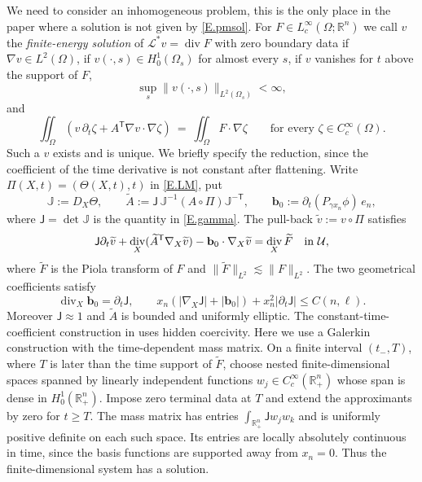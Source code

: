 \documentclass[10pt,a4paper]{amsart}
\numberwithin{equation}{section}
\DeclareMathOperator{\divg}{div}
\newcommand{\R}{\mathbb R}
\newcommand{\br}[1]{\left(#1\right)}
\newcommand{\om}{\Omega}
\newcommand{\pd}{\partial}
\newcommand{\LL}{\mathcal L}
\newcommand{\Uc}{\mathcal U}
\begin{document}
We need to consider an  inhomogeneous problem, this is  the only place in the paper
where a solution is not given by \eqref{E.pmsol}. For
$F\in L^\infty_c(\om;\R^n)$ we call $v$ the \emph{finite-energy solution} of
$\LL^*v=\divg F$ with zero boundary data if $\nabla v\in L^2(\om)$, if
$v(\cdot,s)\in H^1_0(\om_s)$ for almost every $s$, if $v$ vanishes for $t$ above
the support of $F$, 
$$\sup_s\|v(\cdot,s)\|_{L^2(\om_s)}<\infty,$$
and
\begin{equation}\label{E.PDweak}
  \iint_\om\br{v\,\pd_t\zeta+A^{\mathsf T}\nabla v\cdot\nabla\zeta}
  \ =\ \iint_\om F\cdot\nabla\zeta
  \qquad\text{for every }\zeta\in C^\infty_c(\om) .
\end{equation}
Such a $v$ exists and is unique. We briefly specify the reduction, since the
coefficient of the time derivative is not constant after flattening. Write
$\Pi(X,t)=(\Theta(X,t),t)$ in \eqref{E.LM}, put
$$\mathbb J:=D_X\Theta,\qquad
  \widetilde A:=\mathsf J\,\mathbb J^{-1}(A\circ\Pi)\mathbb J^{-\mathsf T},
  \qquad
  \mathbf b_0:=\pd_t(P_{\gamma x_n}\phi)\,e_n,$$
where $\mathsf J=\det\mathbb J$ is the quantity in \eqref{E.gamma}. The
pull-back $\widetilde v:=v\circ\Pi$ satisfies
\begin{equation}\label{E.PDpull}
 \mathsf J\pd_t\widetilde v
 +\divg_X(\widetilde A^{\mathsf T}\nabla_X\widetilde v)
 -\mathbf b_0\cdot\nabla_X\widetilde v
 =\divg_X\widetilde F
 \quad\hbox{in }\Uc,
\end{equation}
where $\widetilde F$ is the Piola transform of $F$ and
$\|\widetilde F\|_{L^2}\lesssim\|F\|_{L^2}$. The two geometrical coefficients
satisfy
\begin{equation}\label{E.PDstructure}
 \divg_X\mathbf b_0=\pd_t\mathsf J,\qquad
 x_n\br{|\nabla_X\mathsf J|+|\mathbf b_0|}
 +x_n^2|\pd_t\mathsf J|\le C(n,\ell).
\end{equation}
Moreover $\mathsf J\approx1$ and $\widetilde A$ is bounded and uniformly
elliptic. The constant-time-coefficient construction in
\cite[\S1.5]{AEN} uses hidden coercivity. Here we use a Galerkin construction
with the time-dependent mass matrix. On a finite interval $(t_-,T)$,
where $T$ is later than the time support of $\widetilde F$, choose nested
finite-dimensional spaces spanned by linearly independent functions
$w_j\in C_c^\infty(\R^n_+)$ whose span is dense in $H^1_0(\R^n_+)$.
Impose zero terminal data at $T$ and extend the approximants by zero
for $t\ge T$.
The mass matrix has entries $\int_{\R^n_+}\mathsf J w_jw_k$ and is uniformly
positive definite on each such space. Its entries are locally absolutely
continuous in time, since the basis functions are supported away from
$x_n=0$. Thus the finite-dimensional system has a solution.
\end{document}
